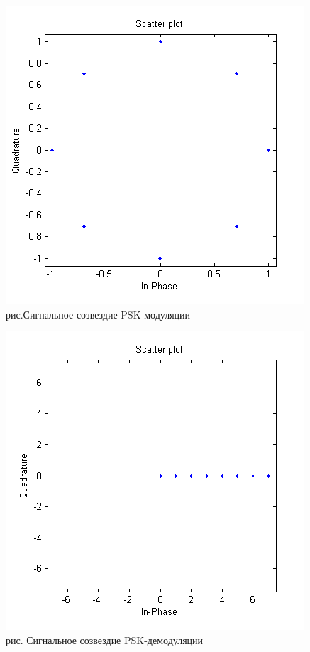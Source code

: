 \documentclass[10pt,a4paper]{report}
\begin{document}
\begin{figure}
\begin{center}
\includegraphics[angle=0, scale = 0.8]{9_3}\newline
рис.Сигнальное созвездие PSK-модуляции\newline
\end{center}
\end{figure}
\begin{figure}
\begin{center}
\includegraphics[angle=0, scale = 0.8]{9_4}\newline
рис. Сигнальное созвездие PSK-демодуляции\newline
\end{center}
\end{figure}
\end{document}
